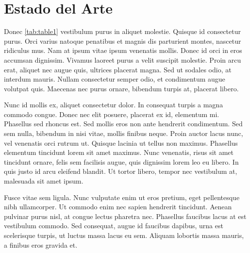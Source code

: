 \chapter{Estado del Arte}\label{chap:estadodelarte}
Donec \ref{tab:table1} vestibulum purus in aliquet molestie. Quisque id consectetur purus. Orci varius natoque penatibus et magnis dis parturient montes, nascetur ridiculus mus. Nam at ipsum vitae ipsum venenatis mollis. Donec id orci in eros accumsan dignissim. Vivamus laoreet purus a velit suscipit molestie. Proin arcu erat, aliquet nec augue quis, ultrices placerat magna. Sed ut sodales odio, at interdum mauris. Nullam consectetur semper odio, et condimentum augue volutpat quis. Maecenas nec purus ornare, bibendum turpis at, placerat libero.\par

Nunc  id mollis ex, aliquet consectetur dolor. In consequat turpis a magna commodo congue. Donec nec elit posuere, placerat ex id, elementum mi. Phasellus sed rhoncus est. Sed mollis eros non ante hendrerit condimentum. Sed sem nulla, bibendum in nisi vitae, mollis finibus neque. Proin auctor lacus nunc, vel venenatis orci rutrum ut. Quisque lacinia ut tellus non maximus. Phasellus elementum tincidunt lorem sit amet maximus. Nunc venenatis, risus sit amet tincidunt ornare, felis sem facilisis augue, quis dignissim lorem leo eu libero. In quis justo id arcu eleifend blandit. Ut tortor libero, tempor nec vestibulum at, malesuada sit amet ipsum.\par

Fusce vitae sem ligula. Nunc vulputate enim ut eros pretium, eget pellentesque nibh ullamcorper. Ut commodo enim nec sapien hendrerit tincidunt. Aenean pulvinar purus nisl, at congue lectus pharetra nec. Phasellus faucibus lacus at est vestibulum commodo. Sed consequat, augue id faucibus dapibus, urna est scelerisque turpis, ut luctus massa lacus eu sem. Aliquam lobortis massa mauris, a finibus eros gravida et.\par


